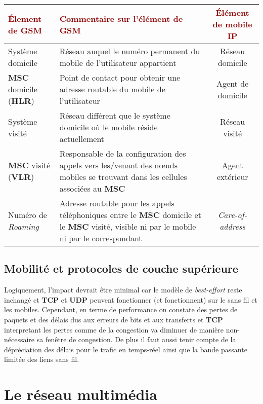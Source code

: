 \documentclass{article}
\newcommand{\dred}[1]{\textcolor{darkred}{\textbf{#1}}}
\newcommand{\neuSPs}{n\oe uds }
\begin{document}
\begin{center}
	\begin{tabular}{|p{120px}|p{180px}|c|}
	\hline
	\dred{Élement de GSM} & \dred{Commentaire sur l'élément de GSM} & \dred{Élément de mobile IP} \\
	\hline
	Système domicile & Réseau auquel le numéro permanent du mobile de l'utilisateur appartient & Réseau domicile 
	\\
	\hline
	\textbf{MSC} domicile (\textbf{HLR}) & Point de contact pour obtenir une adresse routable du mobile de 
	l'utilisateur & Agent de domicile \\
	\hline
	Système visité & Réseau différent que le système domicile où le mobile réside actuellement & Réseau visité \\
	\hline
	\textbf{MSC} visité (\textbf{VLR}) & Responsable de la configuration des appels vers les/venant des \neuSPs 
	mobiles se trouvant	dans les cellules associées au \textbf{MSC} & Agent extérieur \\
	\hline
	Numéro de \textit{Roaming} & Adresse routable pour les appels téléphoniques entre le \textbf{MSC} 
	domicile et le \textbf{MSC} visité, visible ni par le mobile ni par le correspondant & \textit{Care-of-
	address}\\
	\hline
	\end{tabular}
\end{center}

\subsection{Mobilité et protocoles de couche supérieure}

Logiquement, l'impact devrait être minimal car le modèle de \textit{best-effort} reste inchangé et \textbf{TCP} 
et \textbf{UDP} peuvent fonctionner (et fonctionnent) sur le sans fil et les mobiles. Cependant, en terme de 
performance on constate des pertes de paquets et des délais dus aux erreurs de bits et aux transferts et 
\textbf{TCP} interpretant les pertes comme de la congestion va diminuer de manière non-nécessaire sa fenêtre de 
congestion. De plus il faut aussi tenir compte de la dépréciation des délais pour le trafic en temps-réel ainsi 
que la bande passante limitée des liens sans fil. \\

\hbox{\raisebox{0.4em}{\vrule depth 0.4pt height 0.4pt width 10cm}}

\section{Le réseau multimédia}
\end{document}
